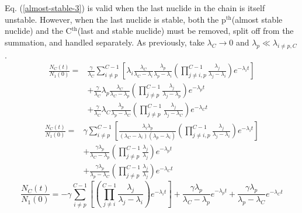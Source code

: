 \documentclass[letterpaper]{physor2018}
\newcommand{\pth}{p$^{\mathrm{th}}$\xspace}
\newcommand{\Cth}{C$^{\mathrm{th}}$\xspace}
\begin{document}
Eq. (\ref{almost-stable-3}) is valid when the last
nuclide in the chain is itself unstable. However, when the last nuclide is stable,
both the \pth (almost stable nuclide) and
the \Cth (last and stable nuclide) must be removed, split off from
the summation, and handled separately. As previously, take $\lambda_C \to 0$ and
$\lambda_p \ll \lambda_{i\ne p,C}$.
\begin{equation}
\label{last-stable-and-almost-stable-0}
\begin{split}
   \frac{N_C(t)}{N_1(0)} = & \frac{\gamma}{\lambda_C}\sum_{i\ne p}^{C-1} \left[\lambda_i \frac{\lambda_C}{\lambda_C - \lambda_i} \frac{\lambda_p}{\lambda_p - \lambda_i}
                                                        \left(\prod_{j\ne i,p}^{C-1} \frac{\lambda_j}{\lambda_j - \lambda_i}\right)
                                                        e^{-\lambda_i t}\right] \\
                           & + \frac{\gamma}{\lambda_C} \lambda_p \frac{\lambda_C}{\lambda_C - \lambda_p} \left(\prod_{j\ne p}^{C-1} \frac{\lambda_j}{\lambda_j - \lambda_p} \right) e^{-\lambda_p t} \\
                           & + \frac{\gamma}{\lambda_C} \lambda_C \frac{\lambda_p}{\lambda_p - \lambda_C} \left(\prod_{j\ne p}^{C-1} \frac{\lambda_j}{\lambda_j - \lambda_C} \right) e^{-\lambda_C t}
\end{split}
\end{equation}
\begin{equation}
\label{last-stable-and-almost-stable-1}
\begin{split}
   \frac{N_C(t)}{N_1(0)} = & \gamma\sum_{i\ne p}^{C-1} \left[\frac{\lambda_i \lambda_p}{(\lambda_C - \lambda_i)(\lambda_p - \lambda_i)}
                                                        \left(\prod_{j\ne i,p}^{C-1} \frac{\lambda_j}{\lambda_j - \lambda_i}\right)
                                                        e^{-\lambda_i t}\right] \\
                           & + \frac{\gamma\lambda_p}{\lambda_C - \lambda_p} \left(\prod_{j\ne p}^{C-1} \frac{\lambda_j}{\lambda_j} \right) e^{-\lambda_p t}\\
                           & + \frac{\gamma\lambda_p}{\lambda_p - \lambda_C} \left(\prod_{j\ne p}^{C-1} \frac{\lambda_j}{\lambda_j} \right) e^{-\lambda_C t}
\end{split}
\end{equation}
\begin{equation}
\label{last-stable-and-almost-stable-2}
   \frac{N_C(t)}{N_1(0)} = -\gamma\sum_{i\ne p}^{C-1} \left[\left(\prod_{j\ne i}^{C-1} \frac{\lambda_j}{\lambda_j - \lambda_i}\right) e^{-\lambda_i t}\right]
                           + \frac{\gamma\lambda_p}{\lambda_C - \lambda_p} e^{-\lambda_p t}
                           + \frac{\gamma\lambda_p}{\lambda_p - \lambda_C} e^{-\lambda_C t}
\end{equation}
\end{document}
